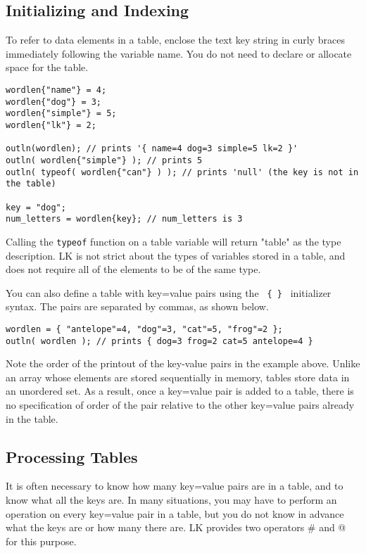 \documentclass{article}
\begin{document}
\subsection{Initializing and Indexing}

To refer to data elements in a table, enclose the text key string in curly braces immediately following the variable name.  You do not need to declare or allocate space for the table.  

\begin{verbatim}
wordlen{"name"} = 4;
wordlen{"dog"} = 3;
wordlen{"simple"} = 5;
wordlen{"lk"} = 2;

outln(wordlen); // prints '{ name=4 dog=3 simple=5 lk=2 }'
outln( wordlen{"simple"} ); // prints 5
outln( typeof( wordlen{"can"} ) ); // prints 'null' (the key is not in the table)

key = "dog";
num_letters = wordlen{key}; // num_letters is 3
\end{verbatim}

Calling the \texttt{typeof} function on a table variable will return "table" as the type description.  LK is not strict about the types of variables stored in a table, and does not require all of the elements to be of the same type.

You can also define a table with key=value pairs using the \texttt{ \{ \} } initializer syntax.  The pairs are separated by commas, as shown below.

\begin{verbatim}
wordlen = { "antelope"=4, "dog"=3, "cat"=5, "frog"=2 };
outln( wordlen ); // prints { dog=3 frog=2 cat=5 antelope=4 }
\end{verbatim}

Note the order of the printout of the key-value pairs in the example above.  Unlike an array whose elements are stored sequentially in memory, tables store data in an unordered set.  As a result, once a key=value pair is added to a table, there is no specification of order of the pair relative to the other key=value pairs already in the table.

\subsection{Processing Tables}

It is often necessary to know how many key=value pairs are in a table, and to know what all the keys are.  In many situations, you may have to perform an operation on every key=value pair in a table, but you do not know in advance what the keys are or how many there are.  LK provides two operators \# and @ for this purpose.
\end{document}
